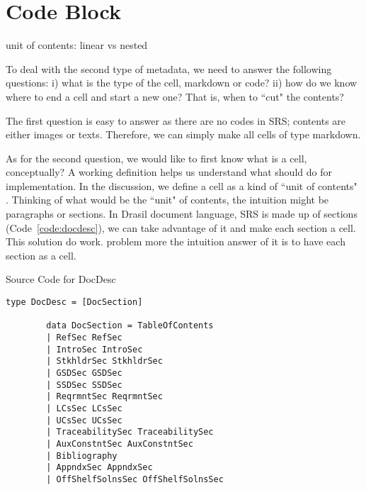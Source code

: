 \chapter{Code Block}
unit of contents: linear vs nested

To deal with the second type of metadata, we need to answer the following 
questions: i) what is the type of the cell, markdown or code? ii) how do we 
know where to end a cell and start a new one? That is, when to ``cut" the 
contents?

The first question is easy to answer as there are no codes in SRS; contents are 
either images or texts. Therefore, we can simply make all cells of type 
markdown. 

As for the second question, we would like to first know what is a cell, 
conceptually? A working definition helps us understand what should do for 
implementation. In the discussion, we define a cell as a kind of ``unit of 
contents" \cite{cellsseparation}.  Thinking of what would be the ``unit" of 
contents, the intuition might be paragraphs or sections. In Drasil document 
language, SRS is made up of sections (Code~\ref{code:docdesc}), we can take 
advantage of it and make each section a cell. This solution do work. 
problem more the intuition answer of it is to have each section as a cell.

\begin{listing}
	\caption{Source Code for DocDesc}
	\label{code:docdesc}
	\begin{lstlisting}[language=haskell1]
		type DocDesc = [DocSection]
		
		data DocSection = TableOfContents
		| RefSec RefSec
		| IntroSec IntroSec
		| StkhldrSec StkhldrSec
		| GSDSec GSDSec
		| SSDSec SSDSec
		| ReqrmntSec ReqrmntSec
		| LCsSec LCsSec
		| UCsSec UCsSec
		| TraceabilitySec TraceabilitySec
		| AuxConstntSec AuxConstntSec
		| Bibliography
		| AppndxSec AppndxSec
		| OffShelfSolnsSec OffShelfSolnsSec
	\end{lstlisting}
\end{listing}